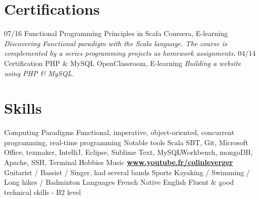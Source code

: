 \documentclass[]{friggeri-cv}
\begin{document}
\section{Certifications}
\begin{entrylist}
  \entry
    {07/16}
    {Functional Programming Principles in Scala}
    {Coursera, E-learning}
    {\emph{Discovering Functional paradigm with the Scala language. The course is complemented by a series programming projects as homework assignments.}}
  \entry
    {04/14}
    {Certification PHP \& MySQL}
    {OpenClassroom, E-learning}
    {\emph{Building a website using PHP \& MySQL.}} 
\end{entrylist}

\section{Skills}
\begin{entrylist}
  \entry
    {Computing}
    {Paradigms}
    {}
    {Functional, imperative, object-oriented, concurrent programming, real-time programming}
  \entry
    {}
    {Notable tools}
    {}
    {Scala SBT, Git, Microsoft Office, texmaker, IntelliJ, Eclipse, Sublime Text, MySQLWorkbench, mongoDB, Apache, SSH, Terminal}
  \entry
    {Hobbies}
    {Music}
    {\href{https://www.youtube.com/channel/UCPBCzj-0apmax9lFwj3qKhA}{\textbf{www.youtube.fr/colinleverger}}}
    {Guitarist / Bassist / Singer, had several bands}
  \entry
    {}
    {Sports}
    {}
    {Kayaking / Swimming / Long hikes / Badminton}
  \entry
    {Languages}
    {French}
    {}
    {Native}
  \entry
    {}
    {English}
    {}
    {Fluent \& good technical skills - B2 level}
\end{entrylist}
\end{document}
